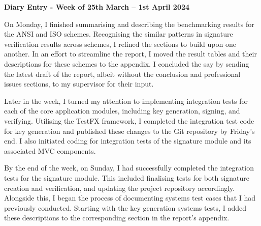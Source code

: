 \documentclass[]{final_report}
\theoremstyle{definition}
\begin{document}
\textbf{Diary Entry - Week of 25th March – 1st April 2024}

On Monday, I finished summarising and describing the benchmarking results for the ANSI and ISO schemes. Recognising the
similar patterns in signature verification results across schemes, I refined the sections to build upon one another. In
an effort to streamline the report, I moved the result tables and their descriptions for these schemes
to the appendix. I concluded the say by sending the latest draft of the report, albeit without the conclusion and
professional issues sections, to my supervisor for their input.

Later in the week, I turned my attention to implementing integration tests for each of the core application modules,
including key generation, signing, and verifying. Utilising the TestFX framework, I completed the integration test code
for key generation and published these changes to the Git repository by Friday's end. I also initiated coding for
integration  tests of the signature module and its associated MVC components.

By the end of the week, on Sunday, I had successfully completed the integration tests for the signature module. This
included finalising tests for both signature creation and verification, and updating the project repository accordingly.
Alongside this, I began the process of documenting systems test cases that I had previously conducted. Starting with the
key generation systems tests, I added these descriptions to the corresponding section in the report’s appendix.




\newpage

\printbibliography
\label{endpage}
\end{document}
